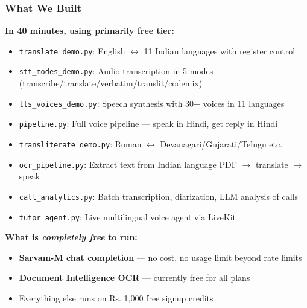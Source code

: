 \begin{frame}[fragile]\frametitle{What We Built}
\textbf{In 40 minutes, using primarily free tier:}
  \begin{itemize}
    \item \texttt{translate\_demo.py}: English $\leftrightarrow$ 11 Indian languages with register control
    \item \texttt{stt\_modes\_demo.py}: Audio transcription in 5 modes (transcribe/translate/verbatim/translit/codemix)
    \item \texttt{tts\_voices\_demo.py}: Speech synthesis with 30+ voices in 11 languages
    \item \texttt{pipeline.py}: Full voice pipeline --- speak in Hindi, get reply in Hindi
    \item \texttt{transliterate\_demo.py}: Roman $\leftrightarrow$ Devanagari/Gujarati/Telugu etc.
    \item \texttt{ocr\_pipeline.py}: Extract text from Indian language PDF $\to$ translate $\to$ speak
    \item \texttt{call\_analytics.py}: Batch transcription, diarization, LLM analysis of calls
    \item \texttt{tutor\_agent.py}: Live multilingual voice agent via LiveKit
  \end{itemize}

\textbf{What is \textit{completely free} to run:}
  \begin{itemize}
    \item \textbf{Sarvam-M chat completion} --- no cost, no usage limit beyond rate limits
    \item \textbf{Document Intelligence OCR} --- currently free for all plans
    \item Everything else runs on Rs. 1,000 free signup credits
  \end{itemize}
\end{frame}

